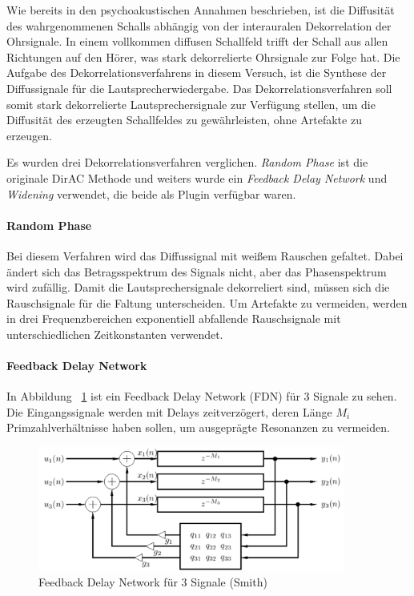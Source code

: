 Wie bereits in den psychoakustischen Annahmen beschrieben, ist die Diffusität des wahrgenommenen Schalls abhängig von der interauralen Dekorrelation der Ohrsignale. In einem vollkommen diffusen Schallfeld trifft der Schall aus allen Richtungen auf den Hörer, was stark dekorrelierte Ohrsignale zur Folge hat. Die Aufgabe des Dekorrelationsverfahrens in diesem Versuch, ist die Synthese der Diffussignale für die Lautsprecherwiedergabe. Das Dekorrelationsverfahren soll somit stark dekorrelierte Lautsprechersignale zur Verfügung stellen, um die Diffusität des erzeugten Schallfeldes zu gewährleisten, ohne Artefakte zu erzeugen.

Es wurden drei Dekorrelationsverfahren verglichen. \textit{Random Phase} ist die originale DirAC Methode und weiters wurde ein \textit{Feedback Delay Network} und \textit{Widening} verwendet, die beide als Plugin verfügbar waren.

\paragraph{Random Phase}
Bei diesem Verfahren wird das Diffussignal mit weißem Rauschen gefaltet. Dabei ändert sich das Betragsspektrum des Signals nicht, aber das Phasenspektrum wird zufällig. Damit die Lautsprechersignale dekorreliert sind, müssen sich die Rauschsignale für die Faltung unterscheiden. Um Artefakte zu vermeiden, werden in drei Frequenzbereichen exponentiell abfallende Rauschsignale mit unterschiedlichen Zeitkonstanten verwendet.

\paragraph{Feedback Delay Network}

In Abbildung ~\ref{fig:fdn} ist ein Feedback Delay Network (FDN) für 3 Signale zu sehen. Die Eingangssignale werden mit Delays zeitverzögert, deren Länge $M_i$ Primzahlverhältnisse haben sollen, um ausgeprägte Resonanzen zu vermeiden.

\begin{figure}[!ht]
  \centering
  \includegraphics[width=0.9\textwidth]{dekorrelation/pic/FDN_smith.png}
  \caption{Feedback Delay Network für 3 Signale (Smith)\protect\footnotemark}
  \label{fig:fdn}
\end{figure}

